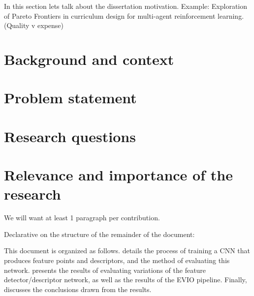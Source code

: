
In this section lets talk about the dissertation motivation.
Example:
Exploration of Pareto Frontiers in curriculum design for multi-agent reinforcement learning. (Quality v expense)


\section{Background and context}%
\label{sec:background}

\section{Problem statement}%
\label{sec:problem_statement}

\section{Research questions}%
\label{sec:research_question}

\section{Relevance and importance of the research}%
\label{sec:relevance_and_importance}

We will want at least 1 paragraph per contribution.

Declarative on the structure of the remainder of the document:

This document is organized as follows. 
 details the process of training a \gls{CNN} that produces feature points and descriptors, and the method of evaluating this network. 
 presents the results of evaluating variations of the feature detector/descriptor network, as well as the results of the \gls{EVIO} pipeline. 
Finally,  discusses the conclusions drawn from the results.


